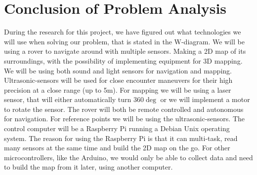 \section{Conclusion of Problem Analysis}

During the research for this project, we have figured out what technologies we will use when solving our problem, that is stated in the W-diagram.
We will be using a rover to navigate around with multiple sensors. Making a 2D map of its surroundings, with the possibility of implementing equipment for 3D mapping. We will be using both sound and light sensors for navigation and mapping. Ultrasonic-sensors will be used for close encounter maneuvers for their high precision at a close range (up to 5m). For mapping we will be using a laser sensor, that will either automatically turn 360$\deg$ or we will implement a motor to rotate the sensor.
The rover will both be remote controlled and autonomous for navigation. For reference points we will be using the ultrasonic-sensors. The control computer will be a Raspberry Pi running a Debian Unix operating system. The reason for using the Raspberry Pi is that it can multi-task, read many sensors at the same time and build the 2D map on the go. For other microcontrollers, like the Arduino, we would only be able to collect data and need to build the map from it later, using another computer.  


\clearpage
